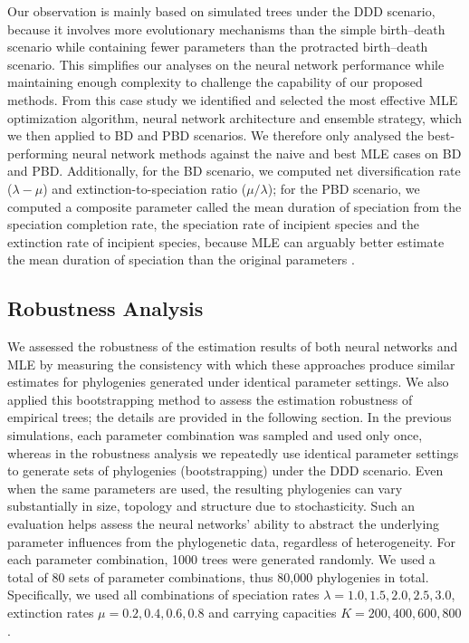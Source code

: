 {Our observation is mainly based on simulated trees under the DDD scenario, because it involves more evolutionary mechanisms than the simple birth--death scenario while containing fewer parameters than the protracted birth--death scenario. This simplifies our analyses on the neural network performance while maintaining enough complexity to challenge the capability of our proposed methods. From this case study we identified and selected the most effective MLE optimization algorithm, neural network architecture and ensemble strategy, which we then applied to BD and PBD scenarios. We therefore only analysed the best-performing neural network methods against the naive and best MLE cases on BD and PBD. Additionally, for the BD scenario, we computed net diversification rate ($\lambda-\mu$) and extinction-to-speciation ratio ($\mu/\lambda$); for the PBD scenario, we computed a composite parameter called the mean duration of speciation from the speciation completion rate, the speciation rate of incipient species and the extinction rate of incipient species, because MLE can arguably better estimate the mean duration of speciation than the original parameters \citep{etienne_estimating_2014}.

\subsection{Robustness Analysis}
\label{ch2::sec::methods::robustness}
We assessed the robustness of the estimation results of both neural networks and MLE by measuring the consistency with which these approaches produce similar estimates for phylogenies generated under identical parameter settings. We also applied this bootstrapping method to assess the estimation robustness of empirical trees; the details are provided in the following section. In the previous simulations, each parameter combination was sampled and used only once, whereas in the robustness analysis we repeatedly use identical parameter settings to generate sets of phylogenies (bootstrapping) under the DDD scenario. Even when the same parameters are used, the resulting phylogenies can vary substantially in size, topology and structure due to stochasticity. Such an evaluation helps assess the neural networks' ability to abstract the underlying parameter influences from the phylogenetic data, regardless of heterogeneity. For each parameter combination, 1000 trees were generated randomly. We used a total of 80 sets of parameter combinations, thus 80,000 phylogenies in total. Specifically, we used all combinations of speciation rates $\lambda = 1.0, 1.5, 2.0, 2.5, 3.0$, extinction rates $\mu = 0.2, 0.4, 0.6, 0.8$ and carrying capacities $K = 200, 400, 600, 800$.

}
